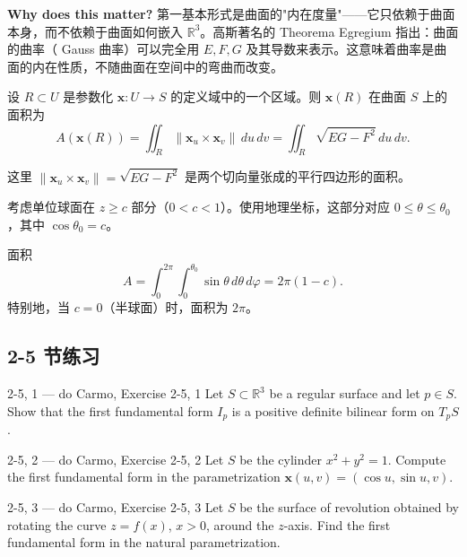 \textbf{Why does this matter?} 第一基本形式是曲面的"内在度量"——它只依赖于曲面本身，而不依赖于曲面如何嵌入 $\mathbb{R}^3$。高斯著名的 Theorema Egregium 指出：曲面的曲率（ Gauss 曲率）可以完全用 $E, F, G$ 及其导数来表示。这意味着曲率是曲面的内在性质，不随曲面在空间中的弯曲而改变。

\begin{Proposition}[曲面的面积]\label{prop:surface-area}
设 $R \subset U$ 是参数化 $\mathbf{x}: U \to S$ 的定义域中的一个区域。则 $\mathbf{x}(R)$ 在曲面 $S$ 上的面积为
\[
A(\mathbf{x}(R)) = \iint_R \|\mathbf{x}_u \times \mathbf{x}_v\| \, du\, dv = \iint_R \sqrt{EG - F^2}\, du\, dv.
\]
\end{Proposition}

这里 $\|\mathbf{x}_u \times \mathbf{x}_v\| = \sqrt{EG - F^2}$ 是两个切向量张成的平行四边形的面积。

\begin{Example}[球冠的面积]\label{ex:sphere-cap-area}
考虑单位球面在 $z \geq c$ 部分（$0 < c < 1$）。使用地理坐标，这部分对应 $0 \leq \theta \leq \theta_0$，其中 $\cos\theta_0 = c$。

面积
\[
A = \int_0^{2\pi} \int_0^{\theta_0} \sin\theta\, d\theta\, d\varphi = 2\pi(1 - c).
\]
特别地，当 $c = 0$（半球面）时，面积为 $2\pi$。
\end{Example}

\subsection*{2-5 节练习}

\begin{exercise}{2-5, 1 — do Carmo, Exercise 2-5, 1}
Let $S \subset \mathbb{R}^3$ be a regular surface and let $p \in S$. Show that the first fundamental form $I_p$ is a positive definite bilinear form on $T_pS$.
\end{exercise}

\begin{exercise}{2-5, 2 — do Carmo, Exercise 2-5, 2}
Let $S$ be the cylinder $x^2 + y^2 = 1$. Compute the first fundamental form in the parametrization $\mathbf{x}(u,v) = (\cos u, \sin u, v)$.
\end{exercise}

\begin{exercise}{2-5, 3 — do Carmo, Exercise 2-5, 3}
Let $S$ be the surface of revolution obtained by rotating the curve $z = f(x)$, $x > 0$, around the $z$-axis. Find the first fundamental form in the natural parametrization.
\end{exercise}

